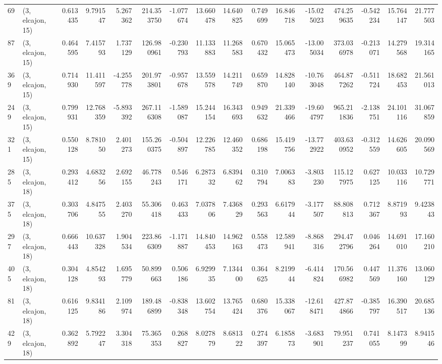 \begin{tabular}{llrrrrrrrrrrrrrr}
69  &  (3, elcajon, 15) &   0.613435 &   9.791547 &   5.267362 &   214.353750 &  -1.077674 &  13.660478 &  14.640825 &  0.749699 &  16.846718 & -15.025023 &   474.259635 &  -0.542234 &  15.764147 &  21.777503 \\
87  &  (3, elcajon, 15) &   0.464595 &   7.415793 &   1.737129 &   126.980961 &  -0.230793 &  11.133883 &  11.268583 &  0.670432 &  15.065473 & -13.005034 &   373.036978 &  -0.213071 &  14.279568 &  19.314165 \\
369 &  (3, elcajon, 15) &   0.714930 &  11.411597 &  -4.255778 &   201.973801 &  -0.957678 &  13.559578 &  14.211749 &  0.659870 &  14.828140 & -10.763048 &   464.877262 &  -0.511724 &  18.682453 &  21.561013 \\
249 &  (3, elcajon, 15) &   0.799931 &  12.768359 &  -5.893392 &   267.116308 &  -1.589087 &  15.244154 &  16.343693 &  0.949632 &  21.339466 & -19.604797 &   965.211836 &  -2.138751 &  24.101116 &  31.067859 \\
321 &  (3, elcajon, 15) &   0.550128 &   8.781050 &   2.401273 &   155.260375 &  -0.504897 &  12.226785 &  12.460352 &  0.686198 &  15.419756 & -13.772922 &   403.630952 &  -0.312559 &  14.626605 &  20.090569 \\
285 &  (3, elcajon, 18) &   0.293412 &   4.683256 &   2.692155 &    46.778243 &   0.546171 &   6.287332 &   6.839462 &  0.310794 &   7.006383 &  -3.803230 &   115.127975 &   0.627125 &  10.033116 &  10.729771 \\
375 &  (3, elcajon, 18) &   0.303706 &   4.847555 &   2.403270 &    55.306418 &   0.463433 &   7.037806 &   7.436829 &  0.293563 &   6.617944 &  -3.177507 &    88.808813 &   0.712367 &   8.871993 &   9.423843 \\
297 &  (3, elcajon, 18) &   0.666443 &  10.637328 &   1.904534 &   223.866309 &  -1.171887 &  14.840453 &  14.962163 &  0.558473 &  12.589941 &  -8.868316 &   294.472796 &   0.046264 &  14.691010 &  17.160210 \\
405 &  (3, elcajon, 18) &   0.304128 &   4.854293 &   1.695779 &    50.899663 &   0.506186 &   6.929935 &   7.134400 &  0.364625 &   8.219944 &  -6.414824 &   170.566982 &   0.447569 &  11.376160 &  13.060129 \\
81  &  (3, elcajon, 18) &   0.616125 &   9.834186 &   2.109974 &   189.486899 &  -0.838348 &  13.602754 &  13.765424 &  0.680376 &  15.338067 & -12.618471 &   427.874866 &  -0.385797 &  16.390517 &  20.685136 \\
429 &  (3, elcajon, 18) &   0.362892 &   5.792247 &   3.304318 &    75.365353 &   0.268827 &   8.027879 &   8.681322 &  0.274397 &   6.185873 &  -3.683901 &    79.951237 &   0.741055 &   8.147399 &   8.941546 \\

\end{tabular}
